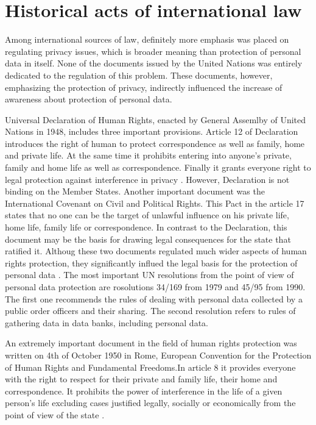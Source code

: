\documentclass[en, noamssymb]{mgr}
\begin{document}
\section{Historical acts of international law}

\indent Among international sources of law, definitely more emphasis was placed on regulating privacy issues, which is broader meaning than protection of personal data in itself. None of the documents issued by the United Nations was entirely dedicated to the regulation of this problem. These documents, however, emphasizing the protection of privacy, indirectly influenced the increase of awareness about protection of personal data.

\indent Universal Declaration of Human Rights, enacted by General Assemlby of United Nations in 1948, includes three important provisions. Article 12 of Declaration introduces the right of human to protect correspondence as well as family, home and private life. At the same time it prohibits entering into anyone's private, family and home life as well as correspondence. Finally it grants everyone right to legal protection against interference in privacy \cite{prawo_odo}. However, Declaration is not binding on the Member States. Another important document was the International Covenant on Civil and Political Rights. This Pact in the article 17 states that no one can be the target of unlawful influence on his private life, home life, family life or correspondence. In contrast to the Declaration, this document may be the basis for drawing legal consequences for the state that ratified it. Althoug these two documents regulated much wider aspects of human rights protection, they significantly influed the legal basis for the protection of personal data \cite{prawo_odo}. The most important UN resolutions from the point of view of personal data protection are rosolutions 34/169 from 1979 and 45/95 from 1990. The first one recommends the rules of dealing with personal data collected by a public order officers and their sharing. The second resolution refers to rules of gathering data in data banks, including personal data.

\indent An extremely important document in the field of human rights protection was written on 4th of October 1950 in Rome, European Convention for the Protection of Human Rights and Fundamental Freedoms.In article 8 it provides everyone with the right to respect for their private and family life, their home and correspondence. It prohibits the power of interference in the life of a given person's life excluding cases justified legally, socially or economically from the point of view of the state \cite{prawo_odo}.
\end{document}
